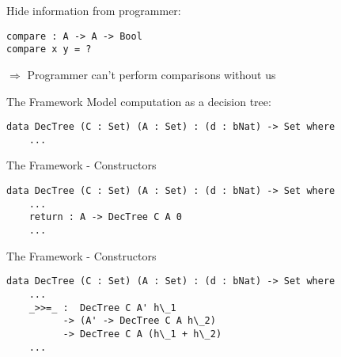 \documentclass[11pt]{beamer}
\begin{document}
    \begin{frame}[fragile]
        Hide information from programmer:

        \begin{lstlisting}[emph=compare]
compare : A -> A -> Bool
compare x y = ?
        \end{lstlisting}

        $\Rightarrow$ Programmer can't perform comparisons without us
    \end{frame}


    \begin{frame}[fragile]{The Framework}
        Model computation as a decision tree:

        \begin{lstlisting}[emph={DecTree}]
data DecTree (C : Set) (A : Set) : (d : bNat) -> Set where
    ...
        \end{lstlisting}

    \end{frame}

    \begin{frame}[fragile]{The Framework - Constructors}
        \begin{lstlisting}[emph={DecTree,return}]
data DecTree (C : Set) (A : Set) : (d : bNat) -> Set where
    ...
    return : A -> DecTree C A 0
    ...
        \end{lstlisting}
    \end{frame}

    \begin{frame}[fragile]{The Framework - Constructors}
        \begin{lstlisting}[emph={DecTree}]
data DecTree (C : Set) (A : Set) : (d : bNat) -> Set where
    ...
    _>>=_ :  DecTree C A' h\_1
          -> (A' -> DecTree C A h\_2)
          -> DecTree C A (h\_1 + h\_2)
    ...
        \end{lstlisting}
    \end{frame}
\end{document}
